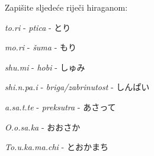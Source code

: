
\author{Katja Kržišnik, Marko Barbančić}


	\begin{mondai}{Zapišite sljedeće riječi hiraganom:}
		\item \textit{to.ri} - \textit{ptica} - とり
		\item \textit{mo.ri} - \textit{šuma} - もり
		\item \textit{shu.mi} - \textit{hobi} - しゅみ
		\item \textit{shi.n.pa.i} - \textit{briga/zabrinutost} - しんぱい
		\item \textit{a.sa.t.te} - \textit{preksutra} - あさって
		\item \textit{O.o.sa.ka} - おおさか
		\item \textit{To.u.ka.ma.chi} - とおかまち
	\end{mondai}


